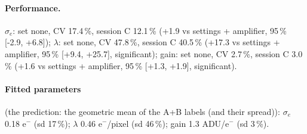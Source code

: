 \paragraph{Performance.}
$\sigma_e$: set none, CV 17.4\,\%, session C 12.1\,\% (+1.9 vs settings + amplifier, 95\,\% [-2.9, +6.8]); $\lambda$: set none, CV 47.8\,\%, session C 40.5\,\% (+17.3 vs settings + amplifier, 95\,\% [+9.4, +25.7], significant); gain: set none, CV 2.7\,\%, session C 3.0\,\% (+1.6 vs settings + amplifier, 95\,\% [+1.3, +1.9], significant).
\paragraph{Fitted parameters} (the prediction: the geometric mean of the A+B labels (and their spread)): $\sigma_e$ 0.18 e$^-$ (sd 17\,\%); $\lambda$ 0.46 e$^-$/pixel (sd 46\,\%); gain 1.3 ADU/e$^-$ (sd 3\,\%).
